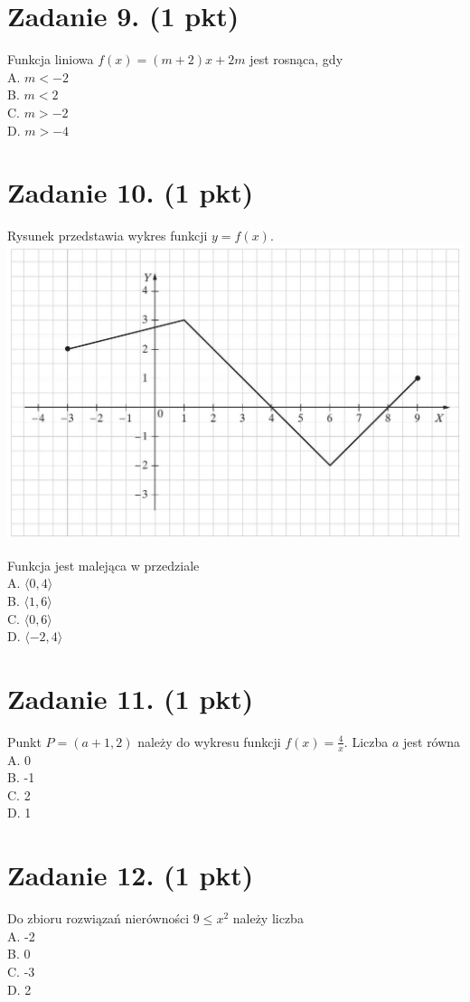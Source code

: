 \documentclass[10pt]{article}
\begin{document}
\section*{Zadanie 9. (1 pkt)}
Funkcja liniowa \(f(x)=(m+2) x+2 m\) jest rosnąca, gdy\\
A. \(m<-2\)\\
B. \(m<2\)\\
C. \(m>-2\)\\
D. \(m>-4\)

\section*{Zadanie 10. (1 pkt)}
Rysunek przedstawia wykres funkcji \(y=f(x)\).\\
\includegraphics[max width=\textwidth, center]{2024_11_21_3a102e13f4b06a61f46fg-04}

Funkcja jest malejąca w przedziale\\
A. \(\langle 0,4\rangle\)\\
B. \(\langle 1,6\rangle\)\\
C. \(\langle 0,6\rangle\)\\
D. \(\langle-2,4\rangle\)

\section*{Zadanie 11. (1 pkt)}
Punkt \(P=(a+1,2)\) należy do wykresu funkcji \(f(x)=\frac{4}{x}\). Liczba \(a\) jest równa\\
A. 0\\
B. -1\\
C. 2\\
D. 1

\section*{Zadanie 12. (1 pkt)}
Do zbioru rozwiązań nierówności \(9 \leqslant x^{2}\) należy liczba\\
A. -2\\
B. 0\\
C. -3\\
D. 2
\end{document}
